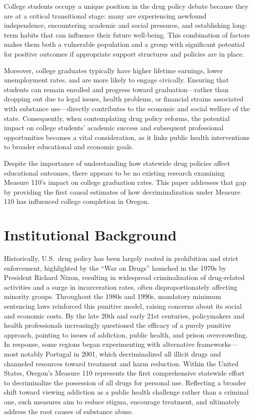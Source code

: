\documentclass[12pt]{article}
\begin{document}
College students occupy a unique position in the drug policy debate because
they are at a critical transitional stage: many are experiencing newfound
independence, encountering academic and social pressures, and establishing
long-term habits that can influence their future well-being. This
combination of factors makes them both a vulnerable population and a group
with significant potential for positive outcomes if appropriate support
structures and policies are in place.

Moreover, college graduates typically have higher lifetime earnings, lower
unemployment rates, and are more likely to engage civically. Ensuring that
students can remain enrolled and progress toward graduation---rather than
dropping out due to legal issues, health problems, or financial strains
associated with substance use---directly contributes to the economic and
social welfare of the state. Consequently, when contemplating drug policy
reforms, the potential impact on college students' academic success and
subsequent professional opportunities becomes a vital consideration, as it
links public health interventions to broader educational and economic
goals.

Despite the importance of understanding how statewide drug policies affect
educational outcomes, there appears to be no existing research examining
Measure 110's impact on college graduation rates. This paper addresses that
gap by providing the first causal estimates of how decriminalization under
Measure 110 has influenced college completion in Oregon.

\section{Institutional Background}

Historically, U.S.\ drug policy has been largely rooted in prohibition and
strict enforcement, highlighted by the ``War on Drugs'' launched in the
1970s by President Richard Nixon, resulting in widespread criminalization
of drug-related activities and a surge in incarceration rates, often
disproportionately affecting minority groups. Throughout the 1980s and
1990s, mandatory minimum sentencing laws reinforced this punitive model,
raising concerns about its social and economic costs. By the late 20th and
early 21st centuries, policymakers and health professionals increasingly
questioned the efficacy of a purely punitive approach, pointing to issues
of addiction, public health, and prison overcrowding. In response, some
regions began experimenting with alternative frameworks---most notably
Portugal in 2001, which decriminalized all illicit drugs and channeled
resources toward treatment and harm reduction. Within the United States,
Oregon's Measure 110 represents the first comprehensive statewide effort to
decriminalize the possession of all drugs for personal use. Reflecting a
broader shift toward viewing addiction as a public health challenge rather
than a criminal one, such measures aim to reduce stigma, encourage
treatment, and ultimately address the root causes of substance abuse.
\end{document}

